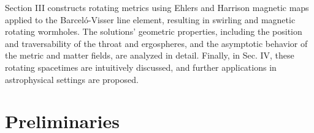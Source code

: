 \documentclass[aps,preprint,groupedaddress,nofootinbib,superscriptaddress,showkeys,showpacs,eqsecnum,amsmath,amssymb]{revtex4-1}
\begin{document}
Section III constructs rotating metrics using Ehlers and Harrison magnetic maps applied to the Barcel\'o-Visser line element, resulting in swirling and magnetic rotating wormholes. 
The solutions' geometric properties, including the position and traversability of the throat and ergospheres, and the asymptotic behavior of the metric and matter fields, are analyzed in detail. Finally, in Sec. IV, these rotating spacetimes are intuitively discussed, and further applications in astrophysical settings are proposed. 


\section{Preliminaries}
\end{document}
